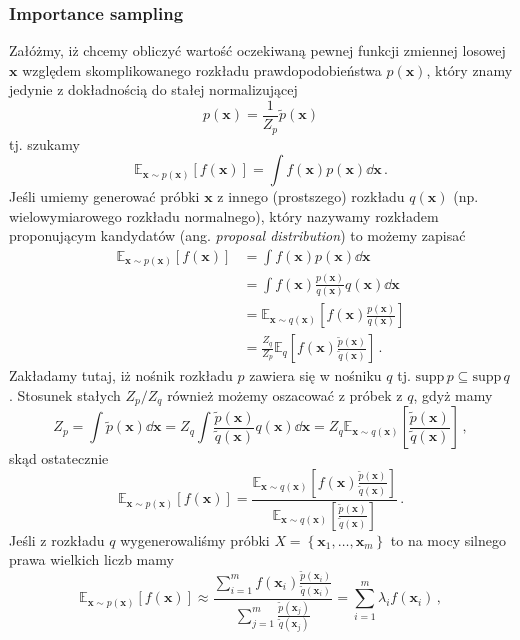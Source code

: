 \documentclass{myclass}
\begin{document}
\subsubsection{Importance sampling}

Załóżmy, iż chcemy obliczyć wartość oczekiwaną pewnej funkcji zmiennej losowej \(\bm{x}\) względem
skomplikowanego rozkładu prawdopodobieństwa \(p(\bm{x})\), który znamy jedynie z dokładnością do
stałej normalizującej
\[
p(\bm{x}) = \frac{1}{Z_p}\tilde{p}(\bm{x})
\]
tj. szukamy
\[
\mathbb{E}_{\bm{x} \sim p(\bm{x})}[f(\bm{x})] = \int f(\bm{x}) p(\bm{x})\dd\bm{x}\,.
\]
Jeśli umiemy generować próbki \(\bm{x}\) z innego (prostszego) rozkładu \(q(\bm{x})\) (np.
wielowymiarowego rozkładu normalnego), który nazywamy rozkładem proponującym kandydatów (ang.
\emph{proposal distribution}) to możemy zapisać
\[
\begin{split}
\mathbb{E}_{\bm{x} \sim p(\bm{x})}[f(\bm{x})] &= \int f(\bm{x})p(\bm{x}) \dd\bm{x} \\
                                              &= \int f(\bm{x})\frac{p(\bm{x})}{q(\bm{x})}q(\bm{x}) \dd\bm{x} \\
                                              &=\mathbb{E}_{\bm{x} \sim q(\bm{x})} \left[f(\bm{x}) \frac{p(\bm{x})}{q(\bm{x})}\right] \\
                                              &= \frac{Z_q}{Z_p}\mathbb{E}_q\left[f(\bm{x}) \frac{\tilde{p}(\bm{x})}{\tilde{q}(\bm{x})}\right]\,.
\end{split}
\]
Zakładamy tutaj, iż nośnik rozkładu \(p\) zawiera się w nośniku \(q\) tj. \(\text{supp}\,p \subseteq
\text{supp}\,q\). Stosunek stałych \(Z_p / Z_q\) również możemy oszacować z próbek z \(q\), gdyż
mamy
\[
Z_p = \int \tilde{p}(\bm{x}) \dd{\bm{x}} = Z_q\int \frac{\tilde{p}(\bm{x})}{\tilde{q}(\bm{x})} q(\bm{x}) \dd{\bm{x}} = Z_q \mathbb{E}_{\bm{x} \sim q(\bm{x})}\left[\frac{\tilde{p}(\bm{x})}{\tilde{q}(\bm{x})}\right]\,,
\]
skąd ostatecznie
\[
\mathbb{E}_{\bm{x} \sim p(\bm{x})}[f(\bm{x})] = \frac{\mathbb{E}_{\bm{x} \sim q(\bm{x})}\left[f(\bm{x}) \frac{\tilde{p}(\bm{x})}{\tilde{q}(\bm{x})}\right]}{\mathbb{E}_{\bm{x} \sim q(\bm{x})}\left[\frac{\tilde{p}(\bm{x})}{\tilde{q}(\bm{x})}\right]}\,.
\]
Jeśli z rozkładu \(q\) wygenerowaliśmy próbki \(X = \left\{\bm{x}_1,\ldots,\bm{x}_m\right\}\) to na
mocy silnego prawa wielkich liczb mamy
\[
\boxed{
\mathbb{E}_{\bm{x} \sim p(\bm{x})}[f(\bm{x})] \approx \frac{\sum_{i=1}^m f(\bm{x}_i) \frac{\tilde{p}(\bm{x}_i)}{\tilde{q}(\bm{x}_i)}}{\sum_{j=1}^m \frac{\tilde{p}(\bm{x}_j)}{\tilde{q}(\bm{x}_j)}} = \sum_{i=1}^m \lambda_i f(\bm{x}_i)\,,
}
\]
\end{document}
